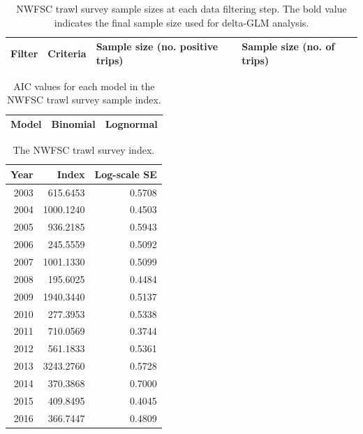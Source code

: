 \documentclass[12pt,]{article}
\begin{document}
\begin{table}[ht]
\centering
\caption{NWFSC trawl survey sample 
                                          sizes at each data filtering step.  
                                          The bold value indicates the final sample size 
                                          used for delta-GLM analysis.} 
\label{tab:Fleet8_NWFSCTrawl_filter}
\begin{tabular}{>{\raggedright}p{1.5in}>{\raggedright}p{2.6in}>{\raggedright}p{1in}>{\raggedright}p{1in}}
  \hline
Filter & Criteria & Sample size (no. positive trips) & Sample size (no. of trips) \\ 
  \hline
\hline
\end{tabular}
\end{table}\begin{table}[ht]
\centering
\caption{AIC values for each model in the
                                          NWFSC trawl survey sample 
                                          index.} 
\label{tab:Fleet8_NWFSCTrawl_aic}
\begin{tabular}{lll}
  \hline
Model & Binomial & Lognormal \\ 
  \hline
\hline
\end{tabular}
\end{table}\begin{table}[ht]
\centering
\caption{The NWFSC trawl survey
                                            index.} 
\label{tab:Fleet8_NWFSCTrawl_index}
\begin{tabular}{rrr}
  \hline
Year & Index & Log-scale SE \\ 
  \hline
 2003 & 615.6453 & 0.5708 \\ 
   2004 & 1000.1240 & 0.4503 \\ 
   2005 & 936.2185 & 0.5943 \\ 
   2006 & 245.5559 & 0.5092 \\ 
   2007 & 1001.1330 & 0.5099 \\ 
   2008 & 195.6025 & 0.4484 \\ 
   2009 & 1940.3440 & 0.5137 \\ 
   2010 & 277.3953 & 0.5338 \\ 
   2011 & 710.0569 & 0.3744 \\ 
   2012 & 561.1833 & 0.5361 \\ 
   2013 & 3243.2760 & 0.5728 \\ 
   2014 & 370.3868 & 0.7000 \\ 
   2015 & 409.8495 & 0.4045 \\ 
   2016 & 366.7447 & 0.4809 \\ 
   \hline
\end{tabular}
\end{table}
\end{document}
